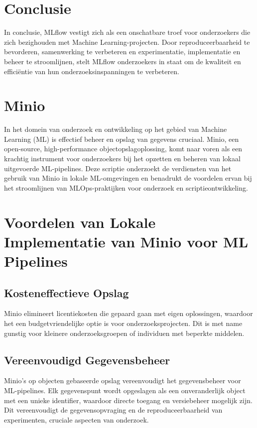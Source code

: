 \section{Conclusie}

In conclusie, MLflow vestigt zich als een onschatbare troef voor onderzoekers die zich bezighouden met Machine Learning-projecten. Door reproduceerbaarheid te bevorderen, samenwerking te verbeteren en experimentatie, implementatie en beheer te stroomlijnen, stelt MLflow onderzoekers in staat om de kwaliteit en efficiëntie van hun onderzoeksinspanningen te verbeteren.


\section{Minio}

In het domein van onderzoek en ontwikkeling op het gebied van Machine Learning (ML) is effectief beheer en opslag van gegevens cruciaal. Minio, een open-source, high-performance objectopslagoplossing, komt naar voren als een krachtig instrument voor onderzoekers bij het opzetten en beheren van lokaal uitgevoerde ML-pipelines. Deze scriptie onderzoekt de verdiensten van het gebruik van Minio in lokale ML-omgevingen en benadrukt de voordelen ervan bij het stroomlijnen van MLOps-praktijken voor onderzoek en scriptieontwikkeling.

\section{Voordelen van Lokale Implementatie van Minio voor ML Pipelines}

\subsection{Kosteneffectieve Opslag}
Minio elimineert licentiekosten die gepaard gaan met eigen oplossingen, waardoor het een budgetvriendelijke optie is voor onderzoeksprojecten. Dit is met name gunstig voor kleinere onderzoeksgroepen of individuen met beperkte middelen.

\subsection{Vereenvoudigd Gegevensbeheer}
Minio's op objecten gebaseerde opslag vereenvoudigt het gegevensbeheer voor ML-pipelines. Elk gegevenspunt wordt opgeslagen als een onveranderlijk object met een unieke identifier, waardoor directe toegang en versiebeheer mogelijk zijn. Dit vereenvoudigt de gegevensopvraging en de reproduceerbaarheid van experimenten, cruciale aspecten van onderzoek.

